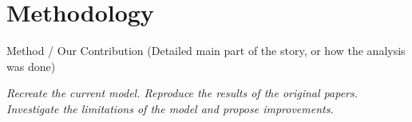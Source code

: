 \section{Methodology}\label{sec:methodology}
Method / Our Contribution (Detailed main part of the story, or how the analysis was done)

\textit{Recreate the current model. Reproduce the results of the original papers. Investigate the limitations of the model and propose improvements.}